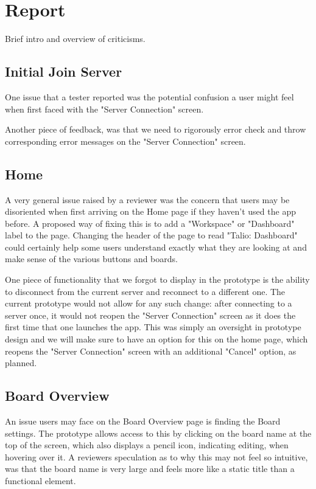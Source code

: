\section{Report}

Brief intro and overview of criticisms.

\subsection{Initial Join Server}

    One issue that a tester reported was the potential confusion a user might feel when first faced with the "Server Connection" screen. 

    Another piece of feedback, was that we need to rigorously error check and throw corresponding error messages on the "Server Connection" screen. 

\subsection{Home}

    A very general issue raised by a reviewer was the concern that users may be disoriented when first arriving on the Home page if they haven't used the app before. A proposed way of fixing this is to add a "Workspace" or "Dashboard" label to the page. Changing the header of the page to read "Talio: Dashboard" could certainly help some users understand exactly what they are looking at and make sense of the various buttons and boards.

    One piece of functionality that we forgot to display in the prototype is the ability to disconnect from the current server and reconnect to a different one. The current prototype would not allow for any such change: after connecting to a server once, it would not reopen the "Server Connection" screen as it does the first time that one launches the app. This was simply an oversight in prototype design and we will make sure to have an option for this on the home page, which reopens the "Server Connection" screen with an additional "Cancel" option, as planned.

\subsection{Board Overview}

    An issue users may face on the Board Overview page is finding the Board settings. The prototype allows access to this by clicking on the board name at the top of the screen, which also displays a pencil icon, indicating editing, when hovering over it. A reviewers speculation as to why this may not feel so intuitive, was that the board name is very large and feels more like a static title than a functional element.

